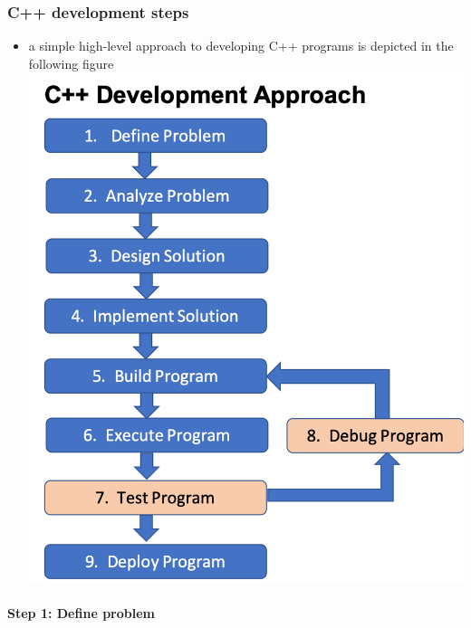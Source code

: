 \documentclass[11pt]{article}
\providecommand{\tightlist}{%
      \setlength{\itemsep}{0pt}\setlength{\parskip}{0pt}}
\begin{document}
\hypertarget{c-development-steps}{%
\subsubsection{C++ development steps}\label{c-development-steps}}

\begin{itemize}
\tightlist
\item
  a simple high-level approach to developing C++ programs is depicted in
  the following figure \includegraphics{resources/CPPDevelopment.png}
\end{itemize}

\hypertarget{step-1-define-problem}{%
\paragraph{Step 1: Define problem}\label{step-1-define-problem}}
\end{document}
